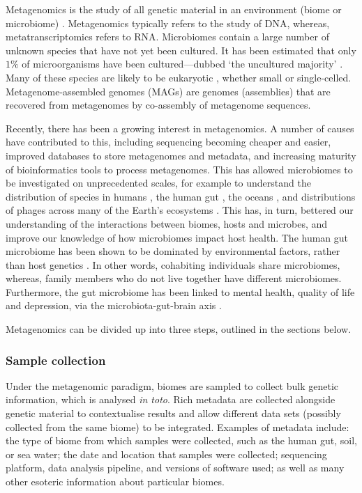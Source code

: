 Metagenomics is the study of all genetic material in an environment (biome or microbiome) \cite{Sberro2019}. Metagenomics typically refers to the study of DNA, whereas, metatranscriptomics refers to RNA. Microbiomes contain a large number of unknown species that have not yet been cultured. It has been estimated \cite{Rinke2013} that only $1\%$ of microorganisms have been cultured---dubbed `the uncultured majority' \cite{Rappe2003}. Many of these species are likely to be eukaryotic \cite{Saary2019}, whether small or single-celled. Metagenome-assembled genomes (MAGs) are genomes (assemblies) that are recovered from metagenomes by co-assembly of metagenome sequences.

Recently, there has been a growing interest in metagenomics. A number of causes have contributed to this, including sequencing becoming cheaper and easier, improved databases to store metagenomes and metadata, and increasing maturity of bioinformatics tools to process metagenomes. This has allowed microbiomes to be investigated on unprecedented scales, for example to understand the distribution of species in humans \cite{Huttenhower2012}, the human gut \cite{Almeida2019,Forster2019}, the oceans \cite{Sunagawa2015,Sunagawa2020}, and distributions of phages across many of the Earth's ecosystems \cite{Al-Shayeb2020}. This has, in turn, bettered our understanding of the interactions between biomes, hosts and microbes, and improve our knowledge of how microbiomes impact host health. The human gut microbiome has been shown to be dominated by environmental factors, rather than host genetics \cite{Rothschild2018}. In other words, cohabiting individuals share microbiomes, whereas, family members who do not live together have different microbiomes. Furthermore, the gut microbiome has been linked to mental health, quality of life and depression, via the microbiota-gut-brain axis \cite{Valles-Colomer2019}.

Metagenomics can be divided up into three steps, outlined in the sections below.

\subsubsection{Sample collection}

Under the metagenomic paradigm, biomes are sampled to collect bulk genetic information, which is analysed \emph{in toto}. Rich metadata are collected alongside genetic material to contextualise results and allow different data sets (possibly collected from the same biome) to be integrated. Examples of metadata include: the type of biome from which samples were collected, such as the human gut, soil, or sea water; the date and location that samples were collected; sequencing platform, data analysis pipeline, and versions of software used; as well as many other esoteric information about particular biomes.

